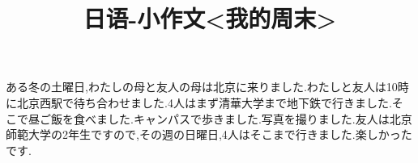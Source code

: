 
\usepackage{../../homeworks_preamble}
\title{日语-小作文<我的周末>}


    \maketitle
     ある冬の土曜日,わたしの母と友人の母は北京に来りました.わたしと友人は10時に北京西駅で待ち合わせました.4人はまず清華大学まで地下鉄で行きました.そこで昼ご飯を食べました.キャンパスで歩きました.写真を撮りました.友人は北京師範大学の2年生ですので,その週の日曜日,4人はそこまで行きました.楽しかったです.

